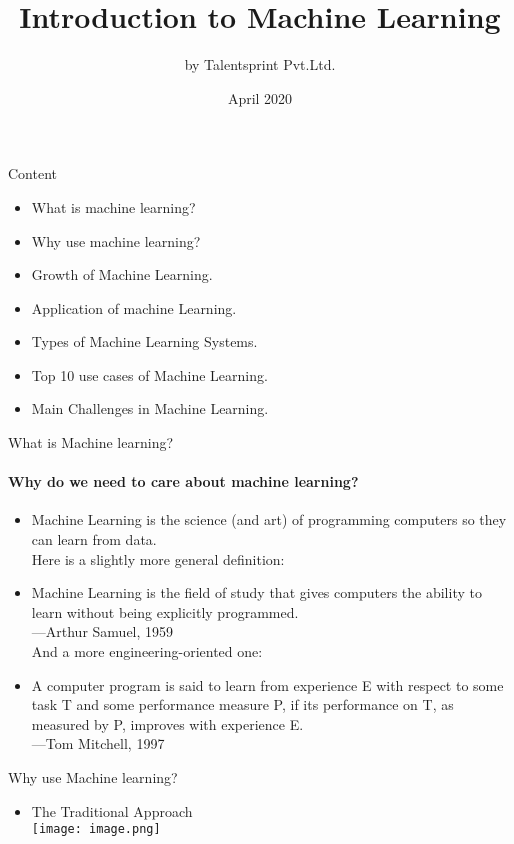 \documentclass{beamer}
\title{Introduction to Machine Learning}
\author{by Talentsprint Pvt.Ltd.}
\date{April 2020}
\begin{document}
\maketitle
\begin{frame}{Content}
\begin{itemize}
\item What is machine learning? 
\item Why use machine learning?
\item Growth of Machine Learning.
\item Application of machine Learning. 
\item Types of Machine Learning Systems.
\item Top 10 use cases of Machine Learning.
\item Main Challenges in Machine Learning.
\end{itemize}
\end{frame}
\begin{frame}{What is Machine learning?}
\framesubtitle{Why do we need to care about machine learning?}
\begin{itemize}
    \item Machine Learning is the science (and art) of programming computers so they can learn from data.\\
\vspace{10pt}
Here is a slightly more general definition:\\
    \item Machine Learning is the field of study that gives computers the ability to learn without being explicitly programmed.\\
—Arthur Samuel, 1959\\
\vspace{10pt}
And a more engineering-oriented one:
    \item A computer program is said to learn from experience E with respect to some task T and some performance measure P, if its performance on T, as measured by P, improves with experience E.\\
—Tom Mitchell, 1997
\end{itemize}
\end{frame}
\begin{frame}{Why use Machine learning?}
\begin{itemize}
    \item The Traditional Approach\\
\vspace{10pt}
    \texttt{[image: image.png]}
\end{itemize}
\end{frame}
\end{document}
